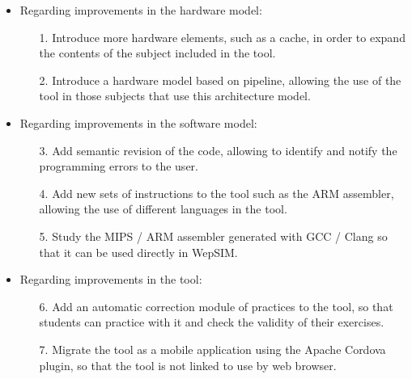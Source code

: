 \begin{itemize}

\item Regarding improvements in the hardware model:

\begin{itemize}

\item[1.] Introduce more hardware elements, such as a cache, in order to expand the contents of the subject included in the tool.

\item[2.] Introduce a hardware model based on pipeline, allowing the use of the tool in those subjects that use this architecture model.

\end{itemize}

\item Regarding improvements in the software model:

\begin{itemize}

\item[3.] Add semantic revision of the code, allowing to identify and notify the programming errors to the user.

\item[4.] Add new sets of instructions to the tool such as the ARM assembler, allowing the use of different languages in the tool.

\item[5.] Study the MIPS / ARM assembler generated with GCC / Clang so that it can be used directly in WepSIM.

\end{itemize}

\item Regarding improvements in the tool:

\begin{itemize}

\item[6.] Add an automatic correction module of practices to the tool, so that students can practice with it and check the validity of their exercises.

\item[7.] Migrate the tool as a mobile application using the Apache Cordova plugin, so that the tool is not linked to use by web browser.

\end{itemize}

\end{itemize}



